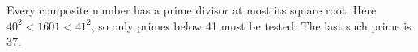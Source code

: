 Every composite number has a prime divisor at most its square root. Here $40^2<1601<41^2$, so only primes below 41 must be tested. The last such prime is $\boxed{37}$.
